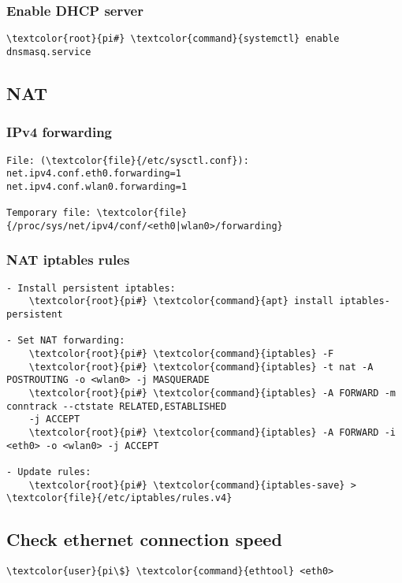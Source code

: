 \documentclass[10pt, a4paper, onecolumn, openany]{book} %
\begin{document}
\subsubsection{Enable DHCP server}
\begin{Verbatim}[commandchars=\\\{\}]
    \textcolor{root}{pi#} \textcolor{command}{systemctl} enable dnsmasq.service
\end{Verbatim}

\subsection{NAT}
\subsubsection{IPv4 forwarding}
\begin{Verbatim}[commandchars=\\\{\}]
File: (\textcolor{file}{/etc/sysctl.conf}):
net.ipv4.conf.eth0.forwarding=1
net.ipv4.conf.wlan0.forwarding=1

Temporary file: \textcolor{file}{/proc/sys/net/ipv4/conf/<eth0|wlan0>/forwarding}
\end{Verbatim}

\subsubsection{NAT iptables rules}
\begin{Verbatim}[commandchars=\\\{\}]
- Install persistent iptables:
    \textcolor{root}{pi#} \textcolor{command}{apt} install iptables-persistent

- Set NAT forwarding:
    \textcolor{root}{pi#} \textcolor{command}{iptables} -F
    \textcolor{root}{pi#} \textcolor{command}{iptables} -t nat -A POSTROUTING -o <wlan0> -j MASQUERADE
    \textcolor{root}{pi#} \textcolor{command}{iptables} -A FORWARD -m conntrack --ctstate RELATED,ESTABLISHED
    -j ACCEPT
    \textcolor{root}{pi#} \textcolor{command}{iptables} -A FORWARD -i <eth0> -o <wlan0> -j ACCEPT

- Update rules:
    \textcolor{root}{pi#} \textcolor{command}{iptables-save} > \textcolor{file}{/etc/iptables/rules.v4}
\end{Verbatim}

\subsection{Check ethernet connection speed}
\begin{Verbatim}[commandchars=\\\{\}]
    \textcolor{user}{pi\$} \textcolor{command}{ethtool} <eth0>
\end{Verbatim}
\end{document}

